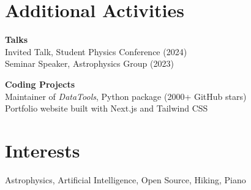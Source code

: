 \documentclass[a4paper,11pt]{article}
\begin{document}
\section{Additional Activities}
\begin{multicols}{2}
\textbf{Talks} \\
 Invited Talk, Student Physics Conference (2024) \\
 Seminar Speaker, Astrophysics Group (2023) \\

\vfill\null
\columnbreak

\textbf{Coding Projects} \\
 Maintainer of \emph{DataTools}, Python package (2000+ GitHub stars) \\
 Portfolio website built with Next.js and Tailwind CSS \\
\end{multicols}

\section{Interests}
Astrophysics, Artificial Intelligence, Open Source, Hiking, Piano
\end{document}
